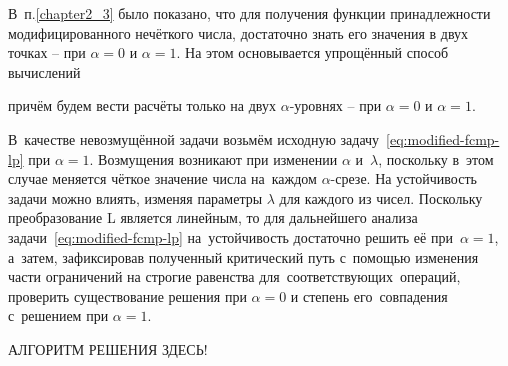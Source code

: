 В~п.\ref{chapter2_3} было показано, что для получения функции принадлежности модифицированного нечёткого числа, достаточно знать его значения в двух точках – при $\alpha=0$ и $\alpha=1$. На этом основывается упрощённый способ вычислений

причём будем вести расчёты только на двух $\alpha$-уровнях – при $\alpha=0$ и $\alpha=1$.

В~качестве невозмущённой задачи возьмём исходную задачу~\eqref{eq:modified-fcmp-lp} при $\alpha=1$. Возмущения возникают при изменении $\alpha$ и~$\lambda$, поскольку в~этом случае меняется чёткое значение числа на~каждом $\alpha$-срезе. На устойчивость задачи можно влиять, изменяя параметры $\lambda$ для каждого из чисел. Поскольку преобразование L является линейным, то для дальнейшего анализа задачи~\eqref{eq:modified-fcmp-lp} на~устойчивость достаточно решить её при~$\alpha=1$, а~затем, зафиксировав полученный критический путь с~помощью изменения части ограничений на строгие равенства для~соответствующих~операций, проверить существование решения при $\alpha=0$ и степень его~совпадения с~решением при $\alpha=1$.

АЛГОРИТМ РЕШЕНИЯ ЗДЕСЬ!